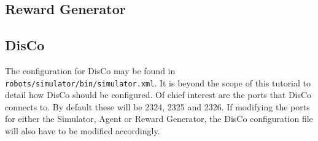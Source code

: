 \documentclass[12pt]{article}
\begin{document}
\subsection{Reward Generator}


\subsection{DisCo}

The configuration for DisCo may be found in 
\verb+robots/simulator/bin/simulator.xml+. It is beyond the scope of this
tutorial to detail how DisCo should be configured. Of chief interest are the
ports that DisCo connects to. By default these will be 2324, 2325 and 2326.
If modifying the ports for either the Simulator, Agent or Reward Generator,
the DisCo configuration file will also have to be modified accordingly.
\end{document}
